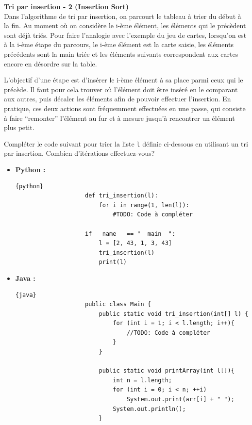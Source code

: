 \begin{Exercice} [20 minutes] \textbf{Tri par insertion - 2 (Insertion Sort)} \\

    Dans l'algorithme de tri par insertion, on parcourt le tableau à trier du début à la fin. Au moment où on considère le i-ème élément, les éléments qui le précèdent sont déjà triés. Pour faire l'analogie avec l'exemple du jeu de cartes, lorsqu'on est à la i-ème étape du parcours, le i-ème élément est la carte saisie, les éléments précédents sont la main triée et les éléments suivants correspondent aux cartes encore en désordre sur la table. 
    
    L'objectif d'une étape est d'insérer le i-ème élément à sa place parmi ceux qui le précède. Il faut pour cela trouver où l'élément doit être inséré en le comparant aux autres, puis décaler les éléments afin de pouvoir effectuer l'insertion. En pratique, ces deux actions sont fréquemment effectuées en une passe, qui consiste à faire ``remonter'' l'élément au fur et à mesure jusqu'à rencontrer un élément plus petit. 
    
    Compléter le code suivant pour trier la liste \lstinline{l} définie ci-dessous en utilisant un tri par insertion. Combien d'itérations effectuez-vous?
    \begin{itemize}
        \item \textbf{Python :}
                \begin{lstlisting}{python}
                    def tri_insertion(l):
                        for i in range(1, len(l)):
                            #TODO: Code à compléter
                    
                    if __name__ == "__main__":
                        l = [2, 43, 1, 3, 43]
                        tri_insertion(l)
                        print(l)
                \end{lstlisting}
        \item \textbf{Java :}
                \begin{lstlisting}{java}
                    public class Main {
                        public static void tri_insertion(int[] l) {
                            for (int i = 1; i < l.length; i++){
                                //TODO: Code à compléter 
                            }
                        }
                        
                        public static void printArray(int l[]){ 
                            int n = l.length; 
                            for (int i = 0; i < n; ++i) 
                                System.out.print(arr[i] + " "); 
                            System.out.println(); 
                        } 
              

\end{lstlisting}
\end{itemize}
\end{Exercice}
